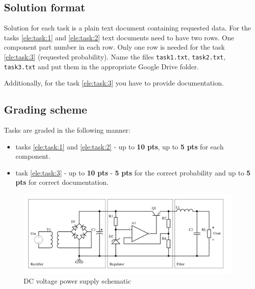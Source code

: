 \documentclass[a4paper]{article}
\begin{document}
\newpage

\subsection{Solution format}
Solution for each task is a plain text document containing requested data. For
the tasks \ref{ele:task:1} and \ref{ele:task:2} text documents need to have 
two rows. One component part number in each row. Only one row is needed for the 
task \ref{ele:task:3} (requested probability). Name the files 
\texttt{task1.txt}, \texttt{task2.txt}, \texttt{task3.txt} and put them in 
the appropriate Google Drive folder.

Additionally, for the task \ref{ele:task:3} you have to provide documentation.

\subsection{Grading scheme}
Tasks are graded in the following manner:
\begin{itemize}
\item tasks \ref{ele:task:1} and \ref{ele:task:2} - up to \textbf{10 pts}, 
up to \textbf{5 pts} for each component.
\item task \ref{ele:task:3} - up to \textbf{10 pts} - \textbf{5 pts} for the 
correct probability and up to \textbf{5 pts} for correct documentation.
\end{itemize}

\begin{figure}
\centering
\includegraphics[width=\linewidth]{images/reg.png}
\caption{DC voltage power supply schematic}
\label{fig:schematic}
\end{figure}
 
\end{document}
